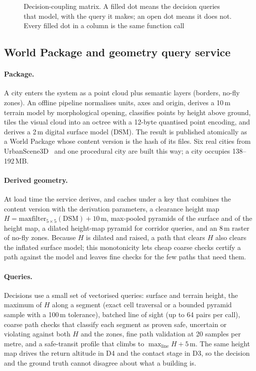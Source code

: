 \begin{figure}[t]
\centering

\caption{Decision-coupling matrix. A filled dot means the decision queries that model, with the query it makes; an
open dot means it does not. Every filled dot in a column is the same function call}
\label{fig:matrix}
\end{figure}

\subsection{World Package and geometry query service}\label{sec:design:world}

\paragraph{Package.} A city enters the system as a point cloud plus semantic layers (borders, no-fly zones). An
offline pipeline normalises units, axes and origin, derives a 10\,m terrain model by morphological opening, classifies
points by height above ground, tiles the visual cloud into an octree with a 12-byte quantised point encoding, and
derives a 2\,m digital surface model (DSM). The result is published atomically as a World Package whose content version is
the hash of its files. Six real cities from UrbanScene3D~\cite{lin2022urbanscene3d} and one procedural city are
built this way; a city occupies 138--192\,MB.

\paragraph{Derived geometry.} At load time the service derives, and caches under a key that combines the content
version with the derivation parameters, a clearance height map $H = \mathrm{maxfilter}_{5\times5}(\mathrm{DSM}) + 10$\,m,
max-pooled pyramids of the surface and of the height map, a dilated height-map pyramid for corridor queries, and an
8\,m raster of no-fly zones. Because $H$ is dilated and raised, a path that clears $H$ also clears the inflated
surface model; this monotonicity lets cheap coarse checks certify a path against the model and leaves fine checks for the few paths that need
them.

\paragraph{Queries.} Decisions use a small set of vectorised queries: surface and terrain height, the maximum of $H$
along a segment (exact cell traversal or a bounded pyramid sample with a 100\,m tolerance), batched line of sight (up
to 64 pairs per call), coarse path checks that classify each segment as proven safe, uncertain or violating against
both $H$ and the zones, fine path validation at 20 samples per metre, and a safe-transit profile that climbs to
$\max_{\text{line}} H + 5$\,m. The same height map drives the return altitude in D4 and the contact stage in D3, so
the decision and the ground truth cannot disagree about what a building is.

